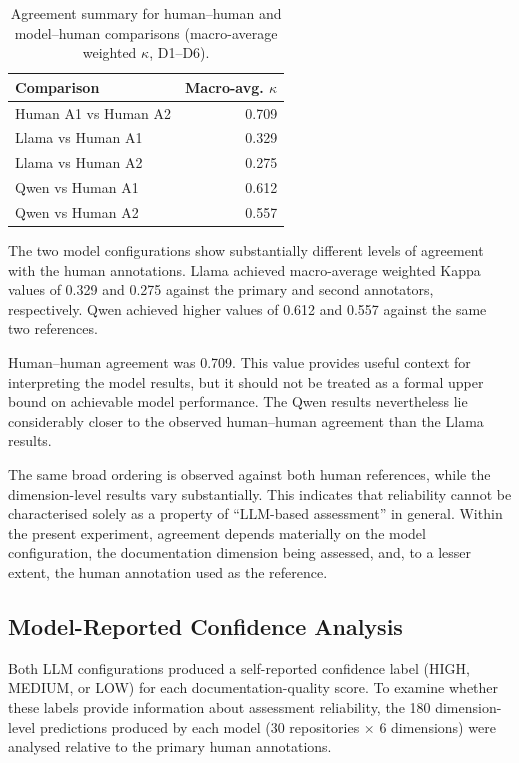 \begin{table}[htbp]
\centering
\caption{Agreement summary for human--human and model--human
comparisons (macro-average weighted $\kappa$, D1--D6).}
\label{tab:agreement_summary}
\begin{tabular}{lr}
\hline
\textbf{Comparison} & \textbf{Macro-avg. $\kappa$} \\
\hline
Human A1 vs Human A2 & 0.709 \\
Llama vs Human A1    & 0.329 \\
Llama vs Human A2    & 0.275 \\
Qwen vs Human A1     & 0.612 \\
Qwen vs Human A2     & 0.557 \\
\hline
\end{tabular}
\end{table}

The two model configurations show substantially different levels of
agreement with the human annotations. Llama achieved macro-average
weighted Kappa values of 0.329 and 0.275 against the primary and
second annotators, respectively. Qwen achieved higher values of
0.612 and 0.557 against the same two references.

Human--human agreement was 0.709. This value provides useful context
for interpreting the model results, but it should not be treated as
a formal upper bound on achievable model performance. The Qwen
results nevertheless lie considerably closer to the observed
human--human agreement than the Llama results.

The same broad ordering is observed against both human references,
while the dimension-level results vary substantially. This indicates
that reliability cannot be characterised solely as a property of
``LLM-based assessment'' in general. Within the present experiment,
agreement depends materially on the model configuration, the
documentation dimension being assessed, and, to a lesser extent,
the human annotation used as the reference.

\subsection{Model-Reported Confidence Analysis}

Both LLM configurations produced a self-reported confidence label
(HIGH, MEDIUM, or LOW) for each documentation-quality score. To
examine whether these labels provide information about assessment
reliability, the 180 dimension-level predictions produced by each
model (30 repositories $\times$ 6 dimensions) were analysed relative
to the primary human annotations.

